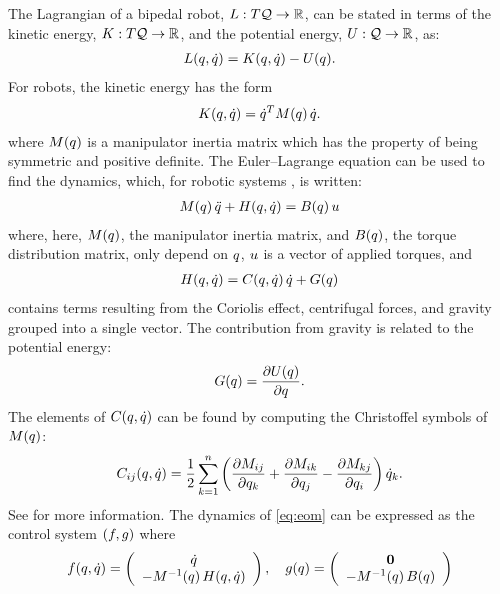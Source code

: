The Lagrangian of a bipedal robot, $L : T\mathcal{Q} \to \mathbb{R}$, can be stated in terms
of the kinetic energy, $K : T\mathcal{Q} \to \mathbb{R}$, and the potential energy, $U : \mathcal{Q} \to
\mathbb{R}$, as:
%
\begin{align*}
  L(q, \dot{q}) = K(q, \dot{q}) - U(q).
\end{align*}
%
For robots, the kinetic energy has the form
\begin{align*}
  K(q, \dot{q}) = \dot{q}^{T} M(q) \, \dot{q}.
\end{align*}
where $M(q)$ is a manipulator inertia matrix which has the property of
being symmetric and positive definite.
%
The Euler--Lagrange equation can be used to find the dynamics, which, for
robotic systems \cite[pp.~171]{Murray1994}, is written:
%
\begin{align}
  \label{eq:eom}
  M(q) \, \ddot{q} + H(q, \dot{q}) = B(q) \, u
\end{align}
%
where, here, $M(q)$, the manipulator inertia matrix, and $B(q)$, the
torque distribution matrix, only depend on $q$, $u$ is a vector of applied
torques, and
\begin{align*}
  H(q, \dot{q}) = C(q, \dot{q}) \, \dot{q} + G(q)
\end{align*}
contains terms resulting from the Coriolis effect, centrifugal forces, and
gravity grouped into a single vector.
%
The contribution from gravity is related to the potential energy:
\begin{align*}
  G(q) = \frac{\partial{U(q)}}{\partial{q}}.
\end{align*}
%
The elements of $C(q, \dot{q})$ can be found by computing the Christoffel
symbols of $M(q)$:
\begin{align*}
  C_{ij}(q, \dot{q}) = \frac{1}{2} \sum_{k = 1}^{n} \left( \frac{\partial{M_{ij}}}{\partial{q_{k}}} +
    \frac{\partial{M_{ik}}}{\partial{q_{j}}} - \frac{\partial{M_{kj}}}{\partial{q_{i}}} \right) \dot{q}_{k}.
\end{align*}
%
See \cite[pp.~170]{Murray1994} for more information.
%
The dynamics of \eqref{eq:eom} can be expressed as the control system $(f,
g)$ where
\begin{align}
  \label{eq:simple-control-system}
  f(q, \dot{q}) = \left(\begin{array}{c}
      \dot{q}\\
      -M^{-1}(q) \, H(q, \dot{q})
    \end{array}\right), \quad
  g(q) = \left(\begin{array}{c}
      {\mathbf 0}\\
      -M^{-1}(q) \, B(q)
    \end{array}\right)
\end{align}

